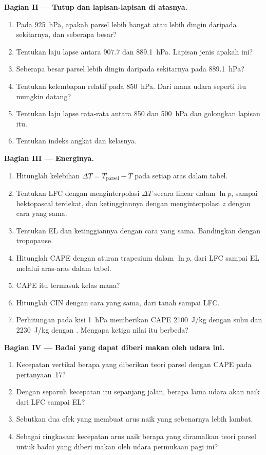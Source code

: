 \begin{problem}
\medskip\noindent\textbf{Bagian II --- Tutup dan lapisan-lapisan di atasnya.}
\begin{enumerate}[resume]
  \item Pada \qty{925}{hPa}, apakah parsel lebih hangat atau lebih dingin daripada sekitarnya, dan seberapa besar?
  \item Tentukan laju lapse antara 907.7 dan \qty{889.1}{hPa}. Lapisan jenis apakah ini?
  \item Seberapa besar parsel lebih dingin daripada sekitarnya pada \qty{889.1}{hPa}?
  \item Tentukan kelembapan relatif pada \qty{850}{hPa}. Dari mana udara seperti itu mungkin datang?
  \item Tentukan laju lapse rata-rata antara 850 dan \qty{500}{hPa} dan golongkan lapisan itu.
  \item Tentukan indeks angkat dan kelasnya.
\end{enumerate}

\medskip\noindent\textbf{Bagian III --- Energinya.}
\begin{enumerate}[resume]
  \item Hitunglah kelebihan $\Delta T = T_{\text{parsel}} - T$ pada setiap aras dalam tabel.
  \item Tentukan LFC dengan menginterpolasi $\Delta T$ secara linear dalam $\ln p$, sampai hektopascal terdekat,
        dan ketinggiannya dengan menginterpolasi $z$ dengan cara yang sama.
  \item Tentukan EL dan ketinggiannya dengan cara yang sama. Bandingkan dengan tropopause.
  \item Hitunglah CAPE dengan aturan trapesium dalam $\ln p$, dari LFC sampai EL melalui
        aras-aras dalam tabel.
  \item CAPE itu termasuk kelas mana?
  \item Hitunglah CIN dengan cara yang sama, dari tanah sampai LFC.
  \item Perhitungan pada kisi \qty{1}{hPa} memberikan CAPE \qty{2100}{J/kg} dengan
        suhu dan \qty{2230}{J/kg} dengan . Mengapa ketiga nilai itu
        berbeda?
\end{enumerate}

\medskip\noindent\textbf{Bagian IV --- Badai yang dapat diberi makan oleh udara ini.}
\begin{enumerate}[resume]
  \item Kecepatan vertikal berapa yang diberikan teori parsel dengan CAPE pada pertanyaan~17?
  \item Dengan separuh kecepatan itu sepanjang jalan, berapa lama udara akan naik dari LFC sampai EL?
  \item Sebutkan dua efek yang membuat arus naik yang sebenarnya lebih lambat.
  \item Sebagai ringkasan: kecepatan arus naik berapa yang diramalkan teori parsel untuk badai yang diberi makan oleh
        udara permukaan pagi ini?
\end{enumerate}
\end{problem}
